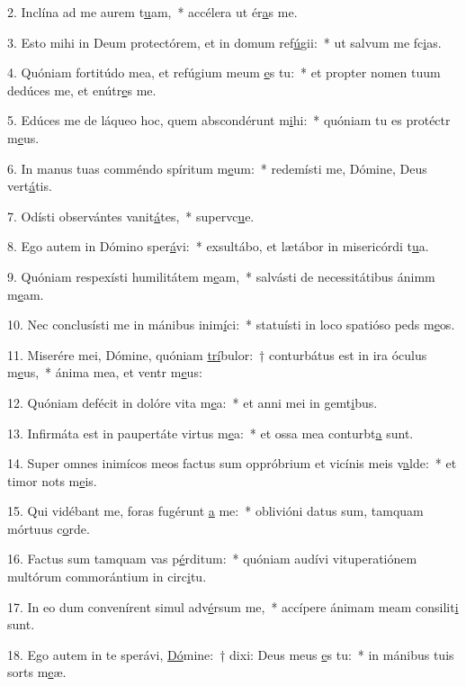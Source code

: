 2. Inclína ad me aurem t\uline{u}am,~* accélera ut ér\uline{a}s me.\par 
3. Esto mihi in Deum protectórem, et in domum ref\uline{ú}gii:~* ut salvum me fc\uline{i}as.\par 
4. Quóniam fortitúdo mea, et refúgium meum \uline{e}s tu:~* et propter nomen tuum dedúces me, et enútr\uline{e}s me.\par 
5. Edúces me de láqueo hoc, quem abscondérunt m\uline{i}hi:~* quóniam tu es protéctr m\uline{e}us.\par 
6. In manus tuas comméndo spíritum m\uline{e}um:~* redemísti me, Dómine, Deus vert\uline{á}tis.\par 
7. Odísti observántes vanit\uline{á}tes,~* supervc\uline{u}e.\par 
8. Ego autem in Dómino sper\uline{á}vi:~* exsultábo, et lætábor in misericórdi t\uline{u}a.\par 
9. Quóniam respexísti humilitátem m\uline{e}am,~* salvásti de necessitátibus ánimm m\uline{e}am.\par 
10. Nec conclusísti me in mánibus inim\uline{í}ci:~* statuísti in loco spatióso peds m\uline{e}os.\par 
11. Miserére mei, Dómine, quóniam \uline{trí}bulor:~† conturbátus est in ira óculus m\uline{e}us,~* ánima mea, et ventr m\uline{e}us:\par 
12. Quóniam defécit in dolóre vita m\uline{e}a:~* et anni mei in gemt\uline{i}bus.\par 
13. Infirmáta est in paupertáte virtus m\uline{e}a:~* et ossa mea conturbt\uline{a} sunt.\par 
14. Super omnes inimícos meos factus sum oppróbrium et vicínis meis v\uline{a}lde:~* et timor nots m\uline{e}is.\par 
15. Qui vidébant me, foras fugérunt \uline{a} me:~* oblivióni datus sum, tamquam mórtuus  c\uline{o}rde.\par 
16. Factus sum tamquam vas p\uline{é}rditum:~* quóniam audívi vituperatiónem multórum commorántium in circ\uline{i}tu.\par 
17. In eo dum convenírent simul adv\uline{é}rsum me,~* accípere ánimam meam consilit\uline{i} sunt.\par 
18. Ego autem in te sperávi, \uline{Dó}mine:~† dixi: Deus meus \uline{e}s tu:~* in mánibus tuis sorts m\uline{e}æ.\par 
